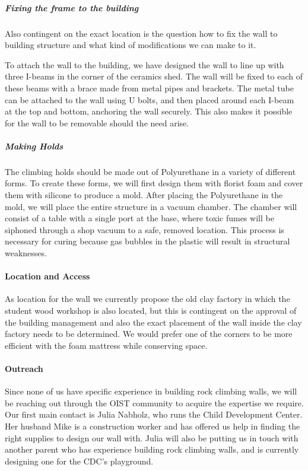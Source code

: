 \documentclass[a4paper, 12pt]{scrartcl}
\begin{document}
\subparagraph{Fixing the frame to the building}
Also contingent on the exact location is the question how to fix the wall to building structure and what kind of modifications we can make to it.

To attach the wall to the building, we have designed the wall to line up with three I-beams in the corner of the ceramics shed. The wall will be fixed to each of these beams with a brace made from metal pipes and brackets. The metal tube can be attached to the wall using U bolts, and then placed around each I-beam at the top and bottom, anchoring the wall securely. This also makes it possible for the wall to be removable should the need arise.

\subparagraph{Making Holds}
The climbing holds should be made out of Polyurethane in a variety of different forms. To create these forms, we will first design them with florist foam and cover them with silicone to produce a mold. After placing the Polyurethane in the mold, we will place the entire structure in a vacuum chamber. The chamber will consist of a table with a single port at the base, where toxic fumes will be siphoned through a shop vacuum to a safe, removed location. This process is necessary for curing because gas bubbles in the plastic will result in structural weaknesses. 


\paragraph{Location and Access}
As location for the wall we currently propose the old clay factory in which the student wood workshop is also located, but this is contingent on the approval of the building management and also the exact placement of the wall inside the clay factory needs to be determined. We would prefer one of the corners to be more efficient with the foam mattress while conserving space.



\paragraph{Outreach}
Since none of us have specific experience in building rock climbing walls, we will be reaching out through the OIST community to acquire the expertise we require. Our first main contact is Julia Nabholz, who runs the Child Development Center. Her husband Mike is a construction worker and has offered us help in finding the right supplies to design our wall with. Julia will also be putting us in touch with another parent who has experience building rock climbing walls, and is currently designing one for the CDC's playground.
\end{document}
